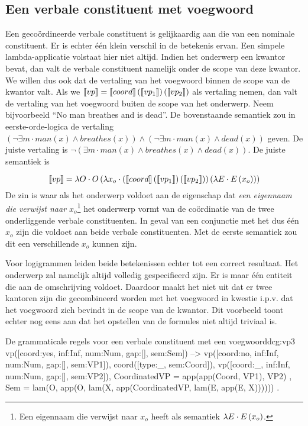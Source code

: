 \subsection{Een verbale constituent met voegwoord}
Een gecoördineerde verbale constituent is gelijkaardig aan die van een nominale constituent. Er is echter één klein verschil in de betekenis ervan. Een simpele lambda-applicatie volstaat hier niet altijd. Indien het onderwerp een kwantor bevat, dan valt de verbale constituent namelijk onder de scope van deze kwantor. We willen dus ook dat de vertaling van het voegwoord binnen de scope van de kwantor valt. Als we $\llbracket vp\rrbracket = \llbracket coord\rrbracket \left( \llbracket vp_1\rrbracket \right) \left( \llbracket vp_2\rrbracket \right)$ als vertaling nemen, dan valt de vertaling van het voegwoord buiten de scope van het onderwerp. Neem bijvoorbeeld ``No man breathes and is dead''. De bovenstaande semantiek zou in eerste-orde-logica de vertaling $(\lnot \exists m \cdot man(x) \land breathes(x)) \land (\lnot \exists m \cdot man(x) \land dead(x))$ geven. De juiste vertaling is $\lnot (\exists m \cdot man(x) \land breathes(x) \land dead(x))$. De juiste semantiek is

$$\llbracket vp\rrbracket = \lambda O \cdot O \left( \lambda x_o \cdot \left( \llbracket coord\rrbracket \left( \llbracket vp_1\rrbracket \right) \left( \llbracket vp_2\rrbracket \right) \right) \left( \lambda E \cdot E \left( x_o \right) \right) \right)$$ De zin is waar als het onderwerp voldoet aan de eigenschap dat \textit{een eigennaam die verwijst naar $x_o$}\footnote{Een eigennaam die verwijst naar $x_o$ heeft als semantiek $\lambda E \cdot E \left( x_o \right)$.} het onderwerp vormt van de coördinatie van de twee onderliggende verbale constituenten. In geval van een conjunctie met het dus één $x_o$ zijn die voldoet aan beide verbale constituenten. Met de eerste semantiek zou dit een verschillende $x_o$ kunnen zijn. 

Voor logigrammen leiden beide betekenissen echter tot een correct resultaat. Het onderwerp zal namelijk altijd volledig gespecifieerd zijn. Er is maar één entiteit die aan de omschrijving voldoet. Daardoor maakt het niet uit dat er twee kantoren zijn die gecombineerd worden met het voegwoord in kwestie i.p.v. dat het voegwoord zich bevindt in de scope van de kwantor. Dit voorbeeld toont echter nog eens aan dat het opstellen van de formules niet altijd triviaal is.

\begin{dcg}{De grammaticale regels voor een verbale constituent met een voegwoord}{dcg:vp3}
vp([coord:yes, inf:Inf, num:Num, gap:[], sem:Sem]) -->
  vp([coord:no, inf:Inf, num:Num, gap:[], sem:VP1]),
  coord([type:_, sem:Coord]),
  vp([coord:_, inf:Inf, num:Num, gap:[], sem:VP2]),
  { CoordinatedVP = app(app(Coord, VP1), VP2) },
  { Sem = lam(O, app(O, lam(X, app(CoordinatedVP, lam(E, app(E, X)))))) }.
\end{dcg}

